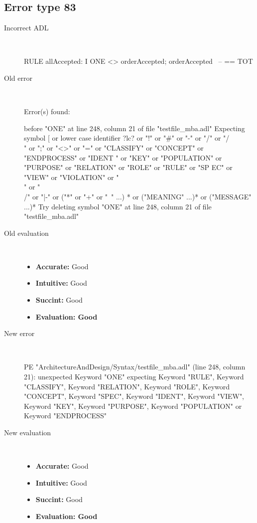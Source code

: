 \subsection{Error type 83}
  \begin{description}
  \item[Incorrect ADL]~\\
\begin{adl}
RULE allAccepted: I ONE <> orderAccepted; orderAccepted~ -- == TOT\end{adl}
  \item[Old error]~\\
\begin{haskell}
Error(s) found:

before "ONE" at line 248, column 21 of file "testfile_mba.adl"
Expecting symbol [ or lower case identifier ?lc? or "!" or "#" or "-" or "/" or
"/\\" or ";" or "<>" or "=" or "CLASSIFY" or "CONCEPT" or "ENDPROCESS" or "IDENT
" or "KEY" or "POPULATION" or "PURPOSE" or "RELATION" or "ROLE" or "RULE" or "SP
EC" or "VIEW" or "VIOLATION" or "\\" or "\\/" or "|-" or ("*" or "+" or "~" ...)
* or ("MEANING" ...)* or ("MESSAGE" ...)*
Try deleting symbol "ONE" at line 248, column 21 of file "testfile_mba.adl"

\end{haskell}
  \item[Old evaluation]~\\
    \begin{itemize}
    \item \textbf{Accurate:} Good
    \item \textbf{Intuitive:} Good
    \item \textbf{Succint:} Good
    \item \textbf{Evaluation: Good}
    \end{itemize}
  \item[New error]~\\
\begin{haskell}
PE "ArchitectureAndDesign/Syntax/testfile_mba.adl" (line 248, column 21):
unexpected Keyword "ONE"
expecting Keyword "RULE", Keyword "CLASSIFY", Keyword "RELATION", Keyword "ROLE", Keyword "CONCEPT", Keyword "SPEC", Keyword "IDENT", Keyword "VIEW", Keyword "KEY", Keyword "PURPOSE", Keyword "POPULATION" or Keyword "ENDPROCESS"
\end{haskell}
  \item[New evaluation]~\\
    \begin{itemize}
    \item \textbf{Accurate:} Good
    \item \textbf{Intuitive:} Good
    \item \textbf{Succint:} Good
    \item \textbf{Evaluation: Good
}
    \end{itemize}
  \end{description}

